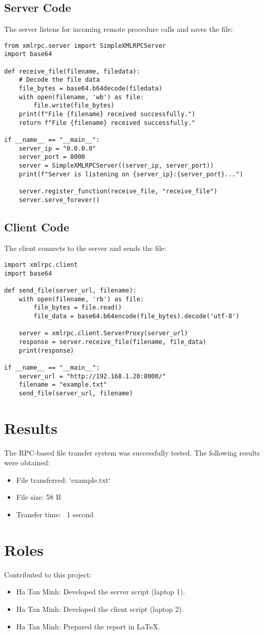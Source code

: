 \documentclass{article}
\begin{document}
\subsection{Server Code}
The server listens for incoming remote procedure calls and saves the file:
\begin{verbatim}
from xmlrpc.server import SimpleXMLRPCServer
import base64

def receive_file(filename, filedata):
    # Decode the file data
    file_bytes = base64.b64decode(filedata)
    with open(filename, 'wb') as file:
        file.write(file_bytes)
    print(f"File {filename} received successfully.")
    return f"File {filename} received successfully."

if __name__ == "__main__":
    server_ip = "0.0.0.0"
    server_port = 8000
    server = SimpleXMLRPCServer((server_ip, server_port))
    print(f"Server is listening on {server_ip}:{server_port}...")

    server.register_function(receive_file, "receive_file")
    server.serve_forever()
\end{verbatim}

\subsection{Client Code}
The client connects to the server and sends the file:
\begin{verbatim}
import xmlrpc.client
import base64

def send_file(server_url, filename):
    with open(filename, 'rb') as file:
        file_bytes = file.read()
        file_data = base64.b64encode(file_bytes).decode('utf-8')

    server = xmlrpc.client.ServerProxy(server_url)
    response = server.receive_file(filename, file_data)
    print(response)

if __name__ == "__main__":
    server_url = "http://192.168.1.20:8000/"
    filename = "example.txt"
    send_file(server_url, filename)
\end{verbatim}

\section{Results}
The RPC-based file transfer system was successfully tested. The following results were obtained:
\begin{itemize}
    \item File transferred: `example.txt`
    \item File size: 58 B
    \item Transfer time: ~1 second
\end{itemize}

\section{Roles}
Contributed to this project:
\begin{itemize}
    \item Ha Tan Minh: Developed the server script (laptop 1).
    \item Ha Tan Minh: Developed the client script (laptop 2).
    \item Ha Tan Minh: Prepared the report in LaTeX.
\end{itemize}
\end{document}
